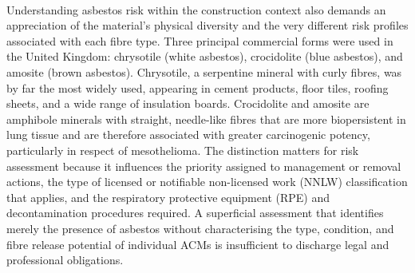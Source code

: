 \paragraph{}
Understanding asbestos risk within the construction context also demands an appreciation of the material's physical diversity and the very different risk profiles associated with each fibre type. Three principal commercial forms were used in the United Kingdom: chrysotile (white asbestos), crocidolite (blue asbestos), and amosite (brown asbestos). Chrysotile, a serpentine mineral with curly fibres, was by far the most widely used, appearing in cement products, floor tiles, roofing sheets, and a wide range of insulation boards. Crocidolite and amosite are amphibole minerals with straight, needle-like fibres that are more biopersistent in lung tissue and are therefore associated with greater carcinogenic potency, particularly in respect of mesothelioma. The distinction matters for risk assessment because it influences the priority assigned to management or removal actions, the type of licensed or notifiable non-licensed work (NNLW) classification that applies, and the respiratory protective equipment (RPE) and decontamination procedures required. A superficial assessment that identifies merely the presence of asbestos without characterising the type, condition, and fibre release potential of individual ACMs is insufficient to discharge legal and professional obligations.


